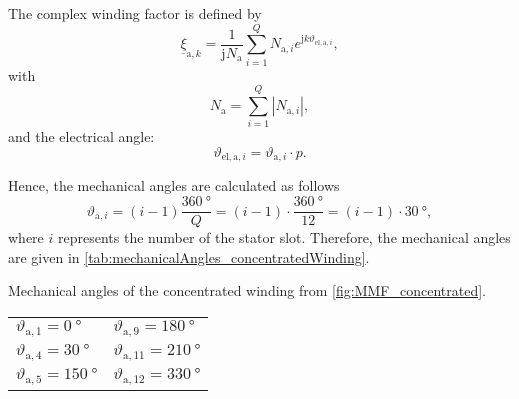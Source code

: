 \begin{solutionblock}
    The complex winding factor is defined by
    \begin{equation}
        \underline{\xi}_{\mathrm{a,}k} = \frac{1}{\mathrm{j}N_{\mathrm{a}}} \sum_{i=1}^{Q} N_{\mathrm{a,}i}e^{\mathrm{j}k\vartheta_{\mathrm{el,a,}i}},
        \label{eq:complexWindingFactor_concentratedWinding}
    \end{equation}
    with
    \begin{equation}
        N_{\mathrm{a}} = \sum_{i=1}^{Q} |N_{\mathrm{a,}i} |,
    \end{equation}
    and the electrical angle:
    \begin{equation}
        \vartheta_{\mathrm{el,a,}i} = \vartheta_{\mathrm{a,}i} \cdot p.
    \end{equation}
    
    Hence, the mechanical angles are calculated as follows
    \begin{equation}
        \vartheta_{\mathrm{a,}i} = \left(i-1 \right) \frac{\SI{360}{\degree}}{Q}
        = \left(i-1 \right) \cdot \frac{\SI{360}{\degree}}{12}
        = \left(i-1 \right)\cdot \SI{30}{\degree},
    \end{equation}
    where $i$ represents the number of the stator slot.
    Therefore, the mechanical angles are given in \autoref{tab:mechanicalAngles_concentratedWinding}.
    \begin{solutiontable}[h]
        \caption{Mechanical angles of the concentrated winding from \autoref{fig:MMF_concentrated}.}
        \centering
        \begin{tabular}{C{3cm}|C{3cm}}\toprule
            $\vartheta_{\mathrm{a,}1} = \SI{0}{\degree}$     & $\vartheta_{\mathrm{a,}9} = \SI{180}{\degree}$ \\
            $\vartheta_{\mathrm{a,}4} = \SI{30}{\degree}$    & $\vartheta_{\mathrm{a,}11} = \SI{210}{\degree}$ \\
            $\vartheta_{\mathrm{a,}5} = \SI{150}{\degree}$    & $\vartheta_{\mathrm{a,}12} = \SI{330}{\degree}$ \\
            \bottomrule
        \end{tabular}
        \label{tab:mechanicalAngles_concentratedWinding}
    \end{solutiontable}


\end{solutionblock}
